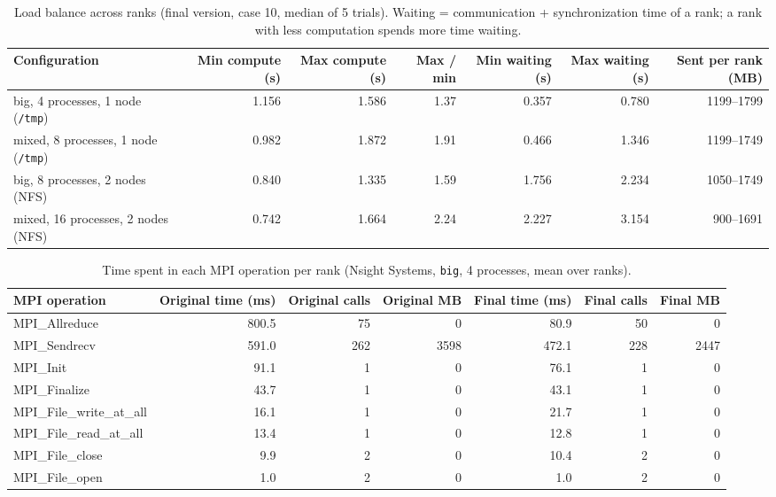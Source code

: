 \begin{table}[htbp]
\centering
\caption{Load balance across ranks (final version, case 10, median of 5 trials). Waiting = communication + synchronization time of a rank; a rank with less computation spends more time waiting.}
\label{tab:per-rank}
\begin{tabular}{lrrrrrr}
\toprule
Configuration & Min compute (s) & Max compute (s) & Max / min & Min waiting (s) & Max waiting (s) & Sent per rank (MB) \\
\midrule
big, 4 processes, 1 node (\texttt{/tmp}) & 1.156 & 1.586 & 1.37 & 0.357 & 0.780 & 1199--1799 \\
mixed, 8 processes, 1 node (\texttt{/tmp}) & 0.982 & 1.872 & 1.91 & 0.466 & 1.346 & 1199--1749 \\
big, 8 processes, 2 nodes (NFS) & 0.840 & 1.335 & 1.59 & 1.756 & 2.234 & 1050--1749 \\
mixed, 16 processes, 2 nodes (NFS) & 0.742 & 1.664 & 2.24 & 2.227 & 3.154 & 900--1691 \\
\bottomrule
\end{tabular}
\end{table}

\begin{table}[htbp]
\centering
\caption{Time spent in each MPI operation per rank (Nsight Systems, \texttt{big}, 4 processes, mean over ranks).}
\label{tab:mpi-ops}
\begin{tabular}{lrrrrrr}
\toprule
MPI operation & Original time (ms) & Original calls & Original MB & Final time (ms) & Final calls & Final MB \\
\midrule
MPI\_Allreduce & 800.5 & 75 & 0 & 80.9 & 50 & 0 \\
MPI\_Sendrecv & 591.0 & 262 & 3598 & 472.1 & 228 & 2447 \\
MPI\_Init & 91.1 & 1 & 0 & 76.1 & 1 & 0 \\
MPI\_Finalize & 43.7 & 1 & 0 & 43.1 & 1 & 0 \\
MPI\_File\_write\_at\_all & 16.1 & 1 & 0 & 21.7 & 1 & 0 \\
MPI\_File\_read\_at\_all & 13.4 & 1 & 0 & 12.8 & 1 & 0 \\
MPI\_File\_close & 9.9 & 2 & 0 & 10.4 & 2 & 0 \\
MPI\_File\_open & 1.0 & 2 & 0 & 1.0 & 2 & 0 \\
\bottomrule
\end{tabular}
\end{table}

